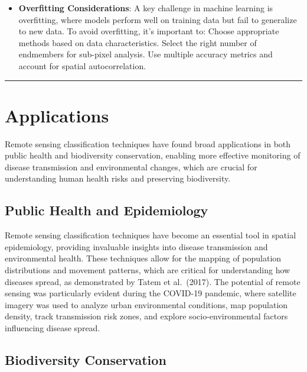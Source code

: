 \documentclass[
  letterpaper,
  DIV=11,
  numbers=noendperiod]{scrreprt}
\providecommand{\tightlist}{%
  \setlength{\itemsep}{0pt}\setlength{\parskip}{0pt}}\usepackage{longtable,booktabs,array}
\begin{document}
\begin{itemize}
\tightlist
\item
  \textbf{Overfitting Considerations}: A key challenge in machine
  learning is overfitting, where models perform well on training data
  but fail to generalize to new data. To avoid overfitting, it's
  important to: Choose appropriate methods based on data
  characteristics. Select the right number of endmembers for sub-pixel
  analysis. Use multiple accuracy metrics and account for spatial
  autocorrelation.
\end{itemize}

\begin{center}\rule{0.5\linewidth}{0.5pt}\end{center}

\section{Applications}\label{applications-4}

Remote sensing classification techniques have found broad applications
in both public health and biodiversity conservation, enabling more
effective monitoring of disease transmission and environmental changes,
which are crucial for understanding human health risks and preserving
biodiversity.

\subsection{Public Health and
Epidemiology}\label{public-health-and-epidemiology}

Remote sensing classification techniques have become an essential tool
in spatial epidemiology, providing invaluable insights into disease
transmission and environmental health. These techniques allow for the
mapping of population distributions and movement patterns, which are
critical for understanding how diseases spread, as demonstrated by Tatem
et al.~(2017). The potential of remote sensing was particularly evident
during the COVID-19 pandemic, where satellite imagery was used to
analyze urban environmental conditions, map population density, track
transmission risk zones, and explore socio-environmental factors
influencing disease spread.

\subsection{Biodiversity Conservation}\label{biodiversity-conservation}
\end{document}
